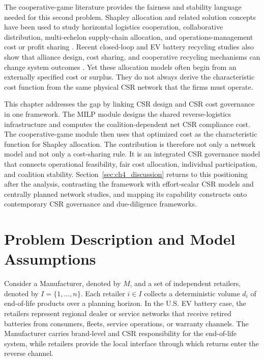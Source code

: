 The cooperative-game literature provides the fairness and stability language needed for this second problem. Shapley allocation and related solution concepts have been used to study horizontal logistics cooperation, collaborative distribution, multi-echelon supply-chain allocation, and operations-management cost or profit sharing \cite{lozano2013cooperative,wang2023collaborative,meng2023profit,luo2022core}. Recent closed-loop and EV battery recycling studies also show that alliance design, cost sharing, and cooperative recycling mechanisms can change system outcomes \cite{ZhengB2022,Xiao2024}. Yet these allocation models often begin from an externally specified cost or surplus. They do not always derive the characteristic cost function from the same physical CSR network that the firms must operate.

This chapter addresses the gap by linking CSR design and CSR cost governance in one framework. The MILP module designs the shared reverse-logistics infrastructure and computes the coalition-dependent net CSR compliance cost. The cooperative-game module then uses that optimized cost as the characteristic function for Shapley allocation. The contribution is therefore not only a network model and not only a cost-sharing rule. It is an integrated CSR governance model that connects operational feasibility, fair cost allocation, individual participation, and coalition stability. Section~\ref{sec:ch4_discussion} returns to this positioning after the analysis, contrasting the framework with effort-scalar CSR models and centrally planned network studies, and mapping its capability constructs onto contemporary CSR governance and due-diligence frameworks.

\section{Problem Description and Model Assumptions}
\label{sec:problem_desc}

Consider a Manufacturer, denoted by $M$, and a set of independent retailers, denoted by $I=\{1,\ldots,n\}$. Each retailer $i\in I$ collects a deterministic volume $d_i$ of end-of-life products over a planning horizon. In the U.S. EV battery case, the retailers represent regional dealer or service networks that receive retired batteries from consumers, fleets, service operations, or warranty channels. The Manufacturer carries brand-level and CSR responsibility for the end-of-life system, while retailers provide the local interface through which returns enter the reverse channel.

